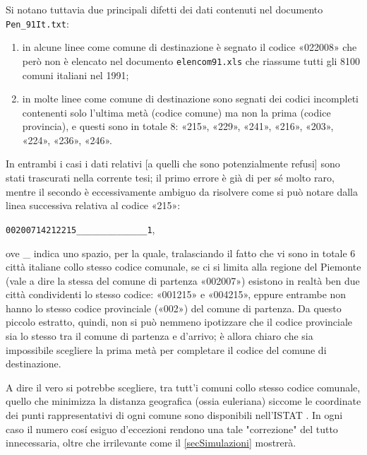         Si notano tuttavia due principali difetti dei dati contenuti nel documento \texttt{Pen\_91It.txt}:

        \begin{enumerate}[
            label=\arabic*.,
            topsep=0.5em,
            parsep=0em,
            itemsep=0.25em,
            leftmargin=2em,
            rightmargin=1.5em,
        ]
            \item in alcune linee come comune di destinazione è segnato il codice «022008» che però non è elencato nel documento \texttt{elencom91.xls} che riassume tutti gli 8100 comuni italiani nel 1991;
            \item in molte linee come comune di destinazione sono segnati dei codici incompleti contenenti solo l'ultima metà (codice comune) ma non la prima (codice provincia), e questi sono in totale 8: «215», «229», «241», «216», «203», «224», «236», «246».
        \end{enumerate}

        In entrambi i casi i dati relativi [a quelli che sono potenzialmente refusi] sono stati trascurati nella corrente tesi; il primo errore è già di per sé molto raro, mentre il secondo è eccessivamente ambiguo da risolvere come si può notare dalla linea successiva relativa al codice «215»:
        \begin{center}
            \texttt{00200714212215\_\_\_\_\_\_\_\_\_\_\_\_\_\_1},
        \end{center}
        ove \_ indica uno spazio, per la quale, tralasciando il fatto che vi sono in totale 6 città italiane collo stesso codice comunale, se ci si limita alla regione del Piemonte (vale a dire la stessa del comune di partenza «002007») esistono in realtà ben due città condividenti lo stesso codice: «001215» e «004215», eppure entrambe non hanno lo stesso codice provinciale («002») del comune di partenza. Da questo piccolo estratto, quindi, non si può nemmeno ipotizzare che il codice provinciale sia lo stesso tra il comune di partenza e d'arrivo; è allora chiaro che sia impossibile scegliere la prima metà per completare il codice del comune di destinazione.

        \begin{oss}
            A dire il vero si potrebbe scegliere, tra tutt'i comuni collo stesso codice comunale, quello che minimizza la distanza geografica (ossia euleriana) siccome le coordinate dei punti rappresentativi di ogni comune sono disponibili nell'ISTAT \cite{ISTATLimiti1991}. In ogni caso il numero cosí esiguo d'eccezioni rendono una tale "correzione" del tutto innecessaria, oltre che irrilevante come il \cref{secSimulazioni} mostrerà.
        \end{oss}


